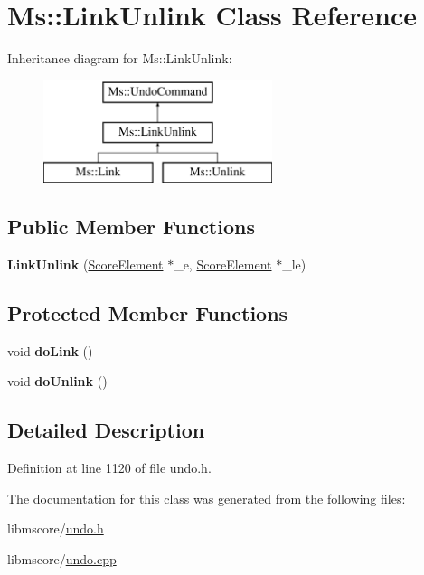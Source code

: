 \hypertarget{class_ms_1_1_link_unlink}{}\section{Ms\+:\+:Link\+Unlink Class Reference}
\label{class_ms_1_1_link_unlink}
Inheritance diagram for Ms\+:\+:Link\+Unlink\+:\begin{figure}[H]
\begin{center}
\leavevmode
\includegraphics[height=3.000000cm]{class_ms_1_1_link_unlink}
\end{center}
\end{figure}
\subsection*{Public Member Functions}
\begin{DoxyCompactItemize}
\item 
\mbox{\label{class_ms_1_1_link_unlink_a6432d28969c00289566e05991e4f557e}} 
{\bfseries Link\+Unlink} (\hyperlink{class_ms_1_1_score_element}{Score\+Element} $\ast$\+\_\+e, \hyperlink{class_ms_1_1_score_element}{Score\+Element} $\ast$\+\_\+le)
\end{DoxyCompactItemize}
\subsection*{Protected Member Functions}
\begin{DoxyCompactItemize}
\item 
\mbox{\label{class_ms_1_1_link_unlink_a3bb752ee54a8f0e4488a79bd955ad30f}} 
void {\bfseries do\+Link} ()
\item 
\mbox{\label{class_ms_1_1_link_unlink_a9aa5fff581adced193bfae829cf9dd21}} 
void {\bfseries do\+Unlink} ()
\end{DoxyCompactItemize}


\subsection{Detailed Description}


Definition at line 1120 of file undo.\+h.



The documentation for this class was generated from the following files\+:\begin{DoxyCompactItemize}
\item 
libmscore/\hyperlink{undo_8h}{undo.\+h}\item 
libmscore/\hyperlink{undo_8cpp}{undo.\+cpp}\end{DoxyCompactItemize}
